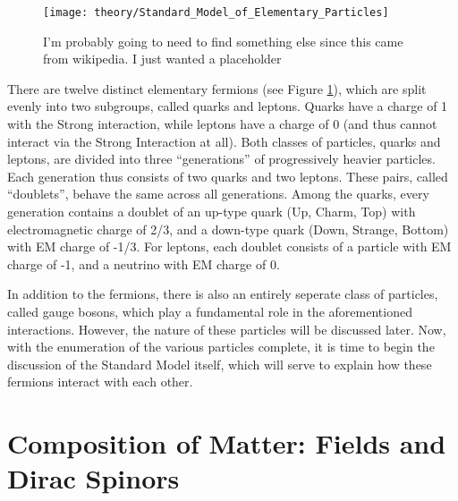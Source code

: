     \begin{figure}[h!]
        \texttt{[image: theory/Standard\_Model\_of\_Elementary\_Particles]}
        \caption{I'm probably going to need to find something else since this came from wikipedia. I just wanted a placeholder}
        \label{fig:sm_particles}
    \end{figure}
        

    There are twelve distinct elementary fermions (see Figure \ref{fig:sm_particles}),
        which are split evenly into two subgroups, called quarks and leptons.
    Quarks have a charge of 1 with the Strong interaction,
        while leptons have a charge of 0 (and thus cannot interact via the Strong Interaction at all).
    Both classes of particles, quarks and leptons, are divided into three ``generations'' of progressively heavier particles.
    Each generation thus consists of two quarks and two leptons.
    These pairs, called ``doublets'', behave the same across all generations.
    Among the quarks, every generation contains a doublet of an up-type quark (Up, Charm, Top) with electromagnetic charge of 2/3,
        and a down-type quark (Down, Strange, Bottom) with EM charge of -1/3.
    For leptons, each doublet consists of a particle with EM charge of -1, and a neutrino with EM charge of 0.

    In addition to the fermions, there is also an entirely seperate class of particles, called gauge bosons,
        which play a fundamental role in the aforementioned interactions.
    However, the nature of these particles will be discussed later.
    Now, with the enumeration of the various particles complete, it is time to begin the discussion of the Standard Model itself,
        which will serve to explain how these fermions interact with each other.



\section{Composition of Matter: Fields and Dirac Spinors}


